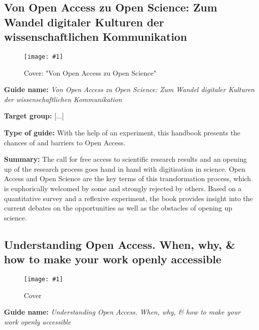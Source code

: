 \documentclass{article}
\newlength{\imgwidth}
\newcommand\scaledgraphics[2]{%
                
\settowidth{\imgwidth}{\texttt{[image: \#1]}}%
                
\setlength{\imgwidth}{\minof{\imgwidth}{#2\textwidth}}%
                
\texttt{[image: \#1]}%
                
}
\begin{document}
\subsection{Von Open Access zu Open Science: Zum Wandel digitaler Kulturen der wissenschaftlichen Kommunikation}\label{H9740541}



\begin{center}
\begin{figure}
\scaledgraphics{499c4719-8346-4a67-8a5b-fcacfb0ecde0.png}{0.5}
\caption*{Cover: "Von Open Access zu Open Science"}\label{F14991031}
\end{figure}


\end{center}


\textbf{Guide name:} \emph{Von Open Access zu Open Science: Zum Wandel digitaler Kulturen der wissenschaftlichen Kommunikation} \autocite{heise_von_2018}


\textbf{Target group: }[...]


\textbf{Type of guide: }With the help of an experiment, this handbook presents the chances of and barriers to Open Access.


\textbf{Summary: }The call for free access to scientific research results and an opening up of the research process goes hand in hand with digitisation in science. Open Access and Open Science are the key terms of this transformation process, which is euphorically welcomed by some and strongly rejected by others. Based on a quantitative survey and a reflexive experiment, the book provides insight into the current debates on the opportunities as well as the obstacles of opening up science.


\subsection{Understanding Open Access. When, why, \& how to make your work openly accessible}\label{H1144211}



\begin{center}
\begin{figure}
\scaledgraphics{37cc2dfd-e350-4e29-acc3-9c7f815eb133.png}{0.5}
\caption*{Cover}\label{F36070241}
\end{figure}


\end{center}


\textbf{Guide name:} \emph{Understanding Open Access. When, why, \& how to make your work openly accessible} 
\end{document}
